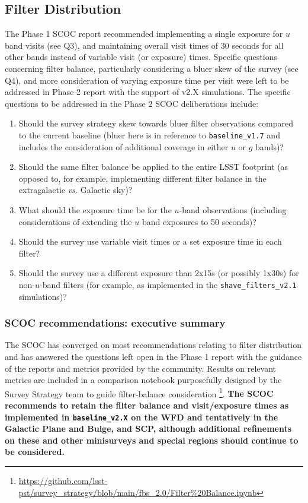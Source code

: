 \subsection{Filter Distribution}\label{q:Filters}

The Phase 1 SCOC report recommended implementing a single exposure for $u$ band visits (see  Q3), and maintaining overall visit times of 30 seconds for all other bands instead of variable visit (or exposure) times. Specific questions concerning filter balance, particularly considering a bluer skew of the survey (see  Q4), and more consideration of varying exposure time per visit were left to be addressed in Phase 2 report with the support of v2.X simulations. The specific questions to be addressed in the Phase 2 SCOC deliberations include:



\begin{enumerate}
\item Should the survey strategy skew towards bluer filter observations compared to the current baseline (bluer here is in reference to \texttt{baseline\_v1.7} and includes the consideration of additional coverage in either $u$ or $g$ bands)?
\item Should the same filter balance be applied to the entire LSST footprint (as opposed to, for example, implementing different filter balance in the extragalactic \emph{vs.} Galactic sky)?
\item What should the exposure time be for the $u$-band observations (including considerations of extending the $u$ band exposures to 50 seconds)? 
\item Should the survey use variable visit times or a set exposure time in each filter?
\item Should the survey use a different exposure than 2x15s (or possibly 1x30s) for non-$u$-band filters (for example, as implemented in the \texttt{shave\_filters\_v2.1} simulations)?
\end{enumerate}

\subsubsection{SCOC recommendations: executive summary }\label{rec:filterdist_es}

The SCOC has converged on most recommendations relating to filter distribution and has answered the questions left open in the Phase 1 report with the guidance of the reports and metrics provided by the community. Results on relevant metrics are included in a comparison notebook purposefully designed by the Survey Strategy team to guide filter-balance consideration \footnote{\url{https://github.com/lsst-pst/survey_strategy/blob/main/fbs_2.0/Filter\%20Balance.ipynb}}. {\bf The SCOC recommends to retain the filter balance and visit/exposure times as implemented in \texttt{baseline\_v2.X} on the WFD and tentatively in the Galactic Plane and Bulge, and SCP, although additional refinements on these and other minisurveys and special regions should continue to be considered. }

